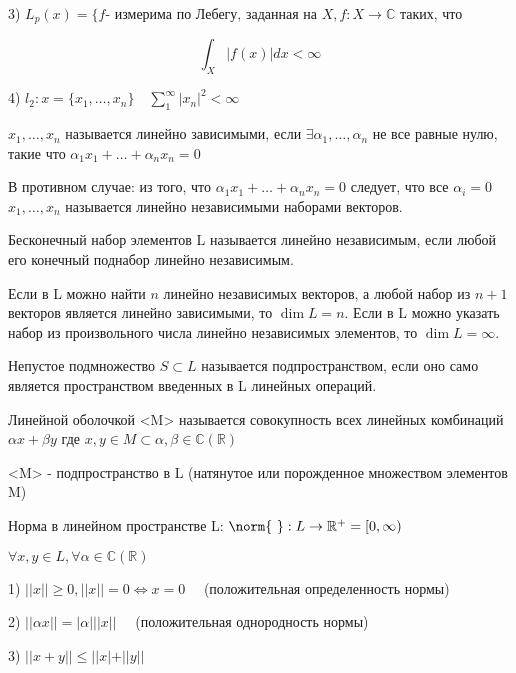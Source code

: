 \documentclass[12pt, a4paper]{report}
\begin{document}
3) \(\displaystyle  L_p (x)= \{f \text{- измерима по Лебегу, заданная на } X , f: X \to  \mathbb{C} \text{ таких, что }   \)

\[  \int_{X}|f(x)|dx< \infty  \] 

4) \(\displaystyle  l_2 : x = \{x_1 , \ldots , x_n  \} \quad \sum ^{\infty }_{1}  |x_n| ^2 < \infty  \) 

\begin{definition}
    \( x_1, \ldots, x_n \)  называется линейно зависимыми, если \( \exists \alpha_1 , \ldots , \alpha _ n   \) не все равные нулю, такие что \( \alpha_1 x_1 + \dots + \alpha_n x_n=0   \)
    
    В противном случае: из того, что \( \alpha_1 x_1 + \dots + \alpha_n x_n=0 \) следует, что все \( \alpha_i =0  \) \( x_1, \ldots, x_n \)  называется линейно независимыми наборами  векторов.  
\end{definition}

\begin{definition}
    Бесконечный набор элементов L называется линейно независимым, если любой его конечный поднабор линейно независимым.
\end{definition}

\begin{definition}
    Если в L можно найти \( n  \)  линейно независимых векторов, а любой набор из \( n+1 \) векторов является линейно зависимыми, то \( \dim L= n \). Если в L можно указать   набор из произвольного числа линейно независимых элементов, то \( \dim L= \infty  \). 
\end{definition}

\begin{definition}
    Непустое подмножество \( S \subset L  \)  называется подпространством, если оно само является пространством введенных в L линейных операций.
\end{definition}

\begin{definition}
    Линейной  оболочкой  <M> называется совокупность всех линейных комбинаций  \( \alpha x + \beta y  \)  где \(  x,y \in  M  \subset \alpha, \beta \in  \mathbb{C}(\mathbb{R}) \) 

    <M> - подпространство в L  (натянутое или порожденное множеством элементов M)
\end{definition}


\begin{definition}
    Норма в линейном пространстве L:  \( \norm{\text{ } }  : L \to  \mathbb{R}^+ = [ 0 , \infty ) \)

    \( \forall x,y \in  L ,  \forall  \alpha \in  \mathbb{C}(\mathbb{R}) \) 
    
    1) \( ||x|| \geq  0 ,||x||=0 \Leftrightarrow x=0  \quad   \) (положительная определенность нормы)
    
    2) \( ||\alpha x||=|\alpha|||x || \quad  \)  (положительная однородность нормы) 

    3) \( ||x+y|| \le  ||x|+||y|| \)
\end{definition}
\end{document}
